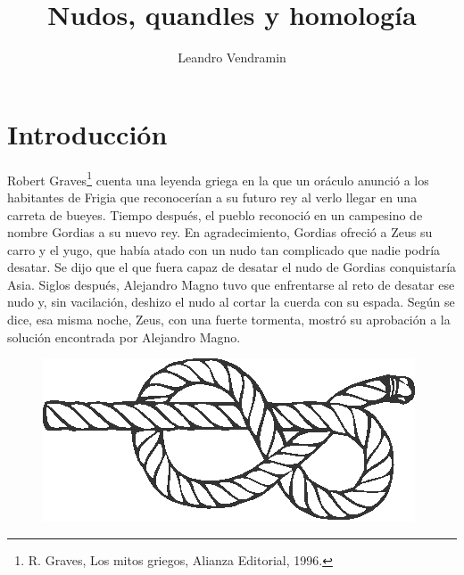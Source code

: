 \documentclass[graybox]{svmult}
\begin{document}
\lstset{language=GAP,
  showstringspaces=false,
  xleftmargin=0.0cm,
  xrightmargin=0.0cm,
  basicstyle=\small\ttfamily,
  frame=single,
  framerule=0pt,
}

\title*{Nudos, quandles y homología}
\author{Leandro Vendramin}


\maketitle


\section{Introducción}

Robert Graves\footnote{R. Graves, Los mitos griegos, Alianza Editorial, 1996.}
cuenta una leyenda griega en la que un oráculo anunció a los habitantes de
Frigia que reconocerían a su futuro rey al verlo llegar en una carreta de
bueyes.  Tiempo después, el pueblo reconoció en un campesino de nombre Gordias
a su nuevo rey. En agradecimiento, Gordias ofreció a Zeus su carro y el yugo,
que había atado con un nudo tan complicado que nadie podría desatar. Se dijo
que el que fuera capaz de desatar el nudo de Gordias conquistaría Asia.  Siglos
después, Alejandro Magno tuvo que enfrentarse al reto de desatar ese nudo y,
sin vacilación, deshizo el nudo al cortar la cuerda con su espada.  Según se
dice, esa misma noche, Zeus, con una fuerte tormenta, mostró su aprobación a la
solución encontrada por Alejandro Magno.

\begin{figure}
    \centering
	\includegraphics[scale=0.6]{images/rope}
\end{figure}
\end{document}
